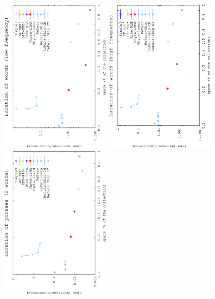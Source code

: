 \documentclass[review]{elsarticle}
\begin{document}
\begin{figure}[t]
\begin{center}
\includegraphics[angle=-90,width=0.49\textwidth]{../figures/f2/words1-1000/nonpos-Wa.eps}
\includegraphics[angle=-90,width=0.49\textwidth]{../figures/f2/words1001-100k/nonpos-Wb.eps}
\includegraphics[angle=-90,width=0.49\textwidth]{../figures/f2/phrases2-2/nopos-2_2.eps}

\end{center}
\end{figure}
\end{document}
